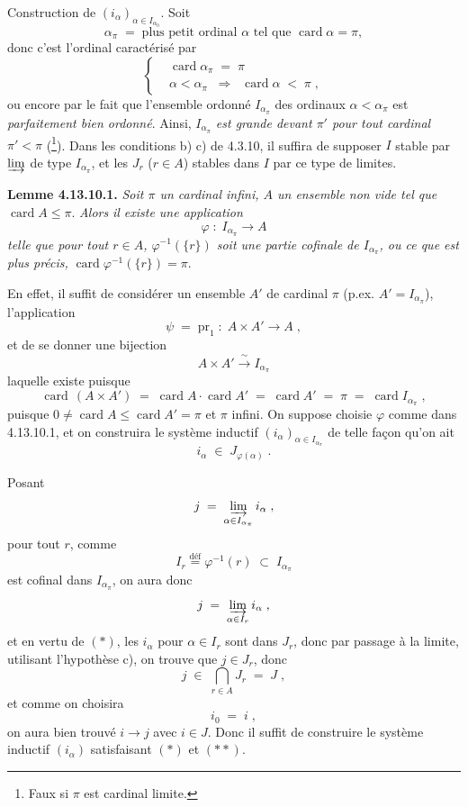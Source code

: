 \documentclass[11pt]{article}
\newcommand{\printedpage}[1]{\marginpar{\footnotesize p.~#1}}
\newcommand{\msp}[1]{\marginpar{\footnotesize [#1]}}
\newcommand{\card}{\operatorname{card}}
\begin{document}
Construction de $(i_\alpha)_{\alpha\in I_{\alpha_0}}$. Soit %
\[ \alpha_\pi \; = \; \text{plus petit ordinal } \alpha \text{ tel que } \card\alpha=\pi, \tag*{(1)} \]
donc c'est l'ordinal caractérisé par
\[ \left\{
\begin{aligned}
&\card\alpha_\pi \; = \; \pi \\
&\alpha<\alpha_\pi \;\; \Longrightarrow \;\; \card\alpha \; < \; \pi \; ,
\end{aligned}
\right. \tag*{(2)} \]
ou encore par le fait que l'ensemble ordonné $I_{\alpha_\pi}$ des ordinaux $\alpha<\alpha_\pi$ est \textit{parfaitement bien ordonné}. Ainsi, $I_{\alpha_\pi}$ \textit{est grande devant $\pi'$ pour tout cardinal $\pi'<\pi$} (\footnote[130]{Faux si $\pi$ est cardinal limite.}). Dans les conditions b) c) de 4.3.10, il suffira de supposer $I$ stable par $\varinjlim$ de type $I_{\alpha_\pi}$, et les $J_r$ ($r\in A$) stables dans $I$ par ce type de limites. %

\textbf{Lemme 4.13.10.1.} \textit{Soit $\pi$ un cardinal infini, $A$ un ensemble non vide tel que} $\card A\leqslant\pi$. \textit{Alors}
\msp{page 299}
\textit{il existe une application}
\[ \varphi \; : \; I_{\alpha_\pi} \longrightarrow A \]
\textit{telle que pour tout $r\in A$, $\varphi^{-1}(\{r\})$ soit une partie cofinale de $I_{\alpha_\pi}$, ou ce que est plus précis,} $\card\varphi^{-1}(\{r\})=\pi$. %

En effet, il suffit de considérer un ensemble $A'$ de cardinal $\pi$ (p.ex. $A'=I_{\alpha_\pi}$), l'application
\[ \psi \; = \; \mathrm{pr}_1 \; : \; A\times A'\longrightarrow A \; , \]
et de se donner une bijection
\[ A\times A' \xrightarrow{\ \sim\ } I_{\alpha_\pi} \]
laquelle existe puisque
\[ \card\,(A\times A') \; = \; \card A\cdot\card A' \; = \; \card A' \; = \; \pi \; = \; \card I_{\alpha_\pi} \; , \]
puisque $0\neq\card A\leqslant\card A'=\pi$ et $\pi$ infini. On suppose choisie $\varphi$ comme dans 4.13.10.1, et on construira le système inductif $(i_\alpha)_{\alpha\in I_{\alpha_\pi}}$ de telle façon qu'on ait
\[ i_\alpha \; \in \; J_{\varphi(\alpha)} \; . \]

Posant
\[ j \; = \; \varinjlim_{\alpha\in I_{\alpha_\pi}} i_\alpha \; , \]
\printedpage{112}
\msp{page 300}
pour tout $r$, comme
\[ I_r \overset{\text{déf}}{=} \varphi^{-1}(r) \; \subset \; I_{\alpha_\pi} \]
est cofinal dans $I_{\alpha_\pi}$, on aura donc
\[ j \; = \; \varinjlim_{\alpha\in I_r} i_\alpha \; , \]
et en vertu de $(*)$, les $i_\alpha$ pour $\alpha\in I_r$ sont dans $J_r$, donc par passage à la limite, utilisant l'hypothèse c), on trouve que $j\in J_r$, donc
\[ j \; \in \; \bigcap_{r\in A} J_r \; = \; J \; , \]
et comme on choisira
\[ i_0 \; = \; i \; , \tag*{$(**)$} \]
on aura bien trouvé $i\longrightarrow j$ avec $i\in J$. Donc il suffit de construire le système inductif $(i_\alpha)$ satisfaisant $(*)$ et $(**)$. %
\end{document}
